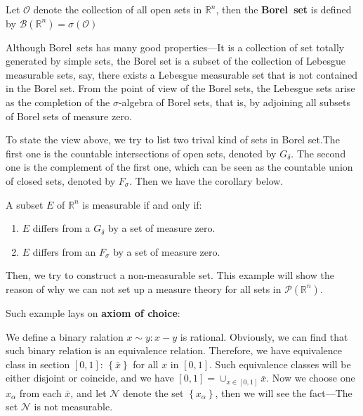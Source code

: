 \documentclass{ctexbook}
\begin{document}
\begin{define}
    Let $\mathcal{O} $ denote the collection of all open sets in $\mathbb{R}^n $, then the \textbf{Borel~set} is defined by
    $\mathscr{B}(\mathbb{R}^n) = \sigma(\mathcal{O})$ 
\end{define}

Although Borel~sets has many good properties---It is a collection of set totally generated by simple sets, the Borel set
is a subset of the collection of Lebesgue measurable sets, say, there exists a Lebesgue measurable set that is not contained
in the Borel set. From the point of view of the Borel sets, the Lebesgue sets arise as the completion of the $\sigma$-algebra
of Borel sets, that is, by adjoining all subsets of Borel sets of measure zero.

To state the view above, we try to list two trival kind of sets in Borel set.The first one is the countable intersections of
open sets, denoted by $G_{\delta}$. The second one is the complement of the first one, which can be seen as the countable union
of closed sets, denoted by $F_{\sigma}$. Then we have the corollary below.

\begin{cor}
    A subset $E$ of $\mathbb{R}^n $ is measurable if and only if:
    \begin{enumerate}
        \item $E$ differs from a $G_{\delta}$ by a set of measure zero.
        \item $E$ differs from an $F_{\sigma}$ by a set of measure zero.
    \end{enumerate}  
\end{cor}

Then, we try to construct a non-measurable set. This example will show the reason of why we can not set up a measure theory
for all sets in $\mathscr{P}(\mathbb{R}^n)$.

Such example lays on \textbf{axiom of choice}:
\begin{fact}
    We define a binary ralation $x\sim y:x-y$ is rational. Obviously, we can find that such binary relation is an equivalence
    relation. Therefore, we have equivalence class in section $[0,1]$: $\left\{\bar{x}\right\} $ for all $x$ in $[0,1]$. Such
    equivalence classes will be either disjoint or coincide, and we have $[0,1]=\cup_{x \in [0,1]}\bar{x}$. Now we
    choose one $x_\alpha$ from each $\bar{x}$, and let $\mathscr{N}$ denote the set $\left\{x_\alpha\right\}$, then we will see
    the fact---The set $\mathscr{N}$ is not measurable.
\end{fact}
\end{document}
